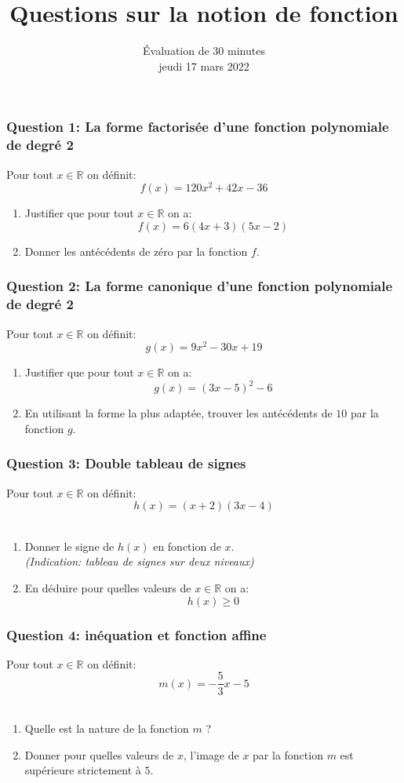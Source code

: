 \documentclass[t,12pt]{beamer}
\title{Questions sur la notion de fonction}
\author{Évaluation de 30 minutes \\jeudi 17 mars 2022}
\newcommand{\R}{\mathbb{R}}
\begin{document}
\maketitle	

\begin{frame}
	\frametitle{Question 1: La forme factorisée d'une fonction polynomiale de degré 2}
	Pour tout  $x\in\R$ on définit: $$f(x)= 120x^2+42x-36 $$ 
	\begin{enumerate}
		\item Justifier que pour tout $x\in\R$ on a: $$f(x)= 6(4x+3)(5x-2)$$ 
		\item Donner les antécédents de zéro par la fonction $f$. 
	\end{enumerate}

\end{frame}

\begin{frame}
	\frametitle{Question 2: La forme canonique d'une fonction polynomiale de degré 2 }
	Pour tout  $x\in\R$ on définit: $$g(x)= 9x^2-30x+19 $$ 
	\begin{enumerate}
		\item Justifier que pour tout $x\in\R$ on a: $$g(x)= (3x-5)^2-6$$ 
		\item En utilisant la forme la plus adaptée, trouver les antécédents de $10$ par la fonction $g$. 
	\end{enumerate}

\end{frame}

\begin{frame}
	\frametitle{Question 3: Double tableau de signes}
	Pour tout  $x\in\R$ on définit: $$h(x) = (x+2)(3x-4)$$ \hfill\\[-0.2cm]
		\begin{enumerate}
		\item Donner le signe de $h(x)$ en fonction de $x$.\\ \small\textit{(Indication: tableau de signes sur deux niveaux) }
		\item En déduire pour quelles valeurs de $x\in\R$ on a:
		$$h(x) \geq 0$$
	\end{enumerate}
	

\end{frame}

\begin{frame}
	\frametitle{Question 4: inéquation et fonction affine}
		Pour tout  $x\in\R$ on définit: $$m(x) = -\dfrac{5}{3}x - 5 $$ \hfill\\[-0.2cm]
	\begin{enumerate}
		\item Quelle est la nature de la fonction $m$ ? 
		\item Donner pour quelles valeurs de $x$, l'image de $x$ par la fonction $m$ est supérieure strictement à $5$.
		
	\end{enumerate}
	
 

\end{frame}
\end{document}
